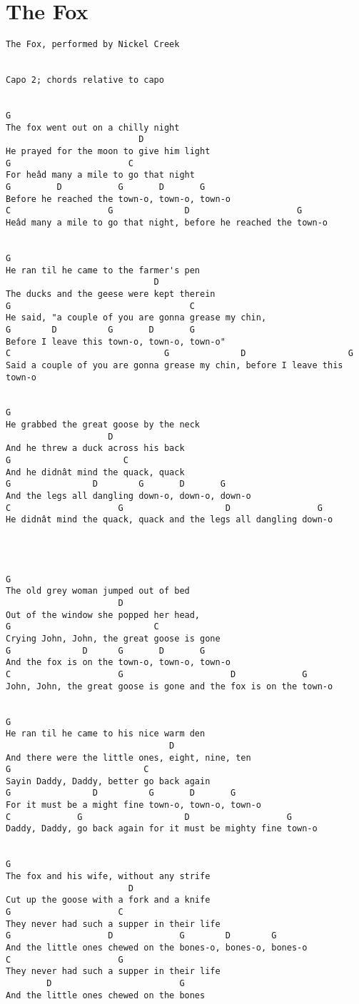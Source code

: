 \documentclass[leqno]{memoir}
\begin{document}
\chapter{The Fox}
\begin{verbatim}
The Fox, performed by Nickel Creek


Capo 2; chords relative to capo

 
G 
The fox went out on a chilly night 
                          D 
He prayed for the moon to give him light 
G                       C 
For heâd many a mile to go that night 
G         D           G       D       G 
Before he reached the town-o, town-o, town-o 
C                   G              D                     G 
Heâd many a mile to go that night, before he reached the town-o 
 
 
G 
He ran til he came to the farmer's pen 
                             D 
The ducks and the geese were kept therein 
G                                   C 
He said, "a couple of you are gonna grease my chin, 
G        D          G       D       G 
Before I leave this town-o, town-o, town-o"
C                              G              D                    G 
Said a couple of you are gonna grease my chin, before I leave this town-o 
 
 
G 
He grabbed the great goose by the neck 
                    D 
And he threw a duck across his back 
G                      C 
And he didnât mind the quack, quack 
G                D        G       D       G 
And the legs all dangling down-o, down-o, down-o 
C                     G                    D                 G 
He didnât mind the quack, quack and the legs all dangling down-o 
 
 
 
 
G 
The old grey woman jumped out of bed 
                      D 
Out of the window she popped her head, 
G                            C 
Crying John, John, the great goose is gone 
G              D      G       D       G 
And the fox is on the town-o, town-o, town-o 
C                     G                     D             G 
John, John, the great goose is gone and the fox is on the town-o 
 
 
G 
He ran til he came to his nice warm den 
                                D 
And there were the little ones, eight, nine, ten 
G                          C 
Sayin Daddy, Daddy, better go back again 
G                D          G       D       G 
For it must be a might fine town-o, town-o, town-o 
C             G                    D                   G 
Daddy, Daddy, go back again for it must be mighty fine town-o 
 
 
G 
The fox and his wife, without any strife 
                        D 
Cut up the goose with a fork and a knife 
G                     C 
They never had such a supper in their life 
G                   D             G        D        G 
And the little ones chewed on the bones-o, bones-o, bones-o 
C                     G 
They never had such a supper in their life 
        D                         G 
And the little ones chewed on the bones 

\end{verbatim}
\newpage
\end{document}
